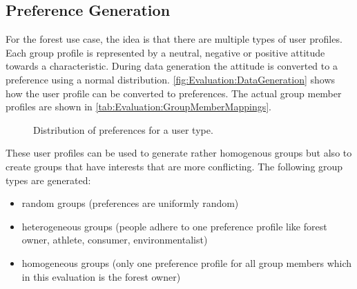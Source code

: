 \subsection{Preference Generation}

For the forest use case, the idea is that there are multiple types of user profiles. Each group profile is represented by a neutral, negative or positive attitude towards a characteristic. During data generation the attitude is converted to a preference  using a normal distribution. \autoref{fig:Evaluation:DataGeneration} shows how the user profile can be converted to preferences. The actual group member profiles are shown in \autoref{tab:Evaluation:GroupMemberMappings}.

\pgfplotsset{height=5cm,width=\textwidth,compat=1.8}
\begin{figure}
 \caption{Distribution of preferences for a user type.}
\label{fig:Evaluation:DataGeneration}
\end{figure}

These user profiles can be used to generate rather homogenous groups but also to create groups that have interests that are more conflicting. The following group types are generated: 

\begin{itemize}
    \item random groups (preferences are uniformly random)
    \item heterogeneous groups (people adhere to one preference profile like forest owner, athlete, consumer, environmentalist)
    \item homogeneous groups (only one preference profile for all group members which in this evaluation is the forest owner)
\end{itemize}

